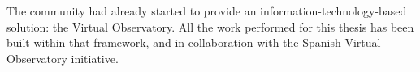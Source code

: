 	The community had already started to provide an
	information-technology-based solution: the Virtual Observatory.
	All the work performed for this thesis has been built within
	that framework, and in collaboration with the Spanish Virtual
	Observatory initiative.
	

